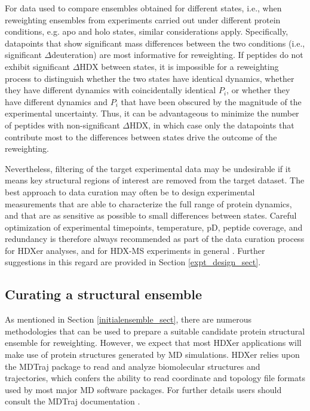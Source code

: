 \documentclass[9pt,tutorial,ASAPversion]{livecoms}
\begin{document}
For data used to compare ensembles obtained for different states, i.e., when reweighting ensembles from experiments carried out under different protein conditions, e.g. apo and holo states, similar considerations apply. Specifically, datapoints that show significant mass differences between the two conditions (i.e., significant $\Delta$deuteration) are most informative for reweighting.
If peptides do not exhibit significant $\Delta$HDX between states, it is impossible for a reweighting process to distinguish whether the two states have identical dynamics, whether they have different dynamics with coincidentally identical $P_i$, or whether they have different dynamics and $P_i$ that have been obscured by the magnitude of the experimental uncertainty.
Thus, it can be advantageous to minimize the number of peptides with non-significant $\Delta$HDX, in which case only the datapoints that contribute most to the differences between states drive the outcome of the reweighting.

Nevertheless, filtering of the target experimental data may be undesirable if it means key structural regions of interest are removed from the target dataset.
The best approach to data curation may often be to design experimental measurements that are able to characterize the full range of protein dynamics, and that are as sensitive as possible to small differences between states.
Careful optimization of experimental timepoints, temperature, pD, peptide coverage, and redundancy is therefore always recommended as part of the data curation process for HDXer analyses, and for HDX-MS experiments in general \cite{Masson2019}.
Further suggestions in this regard are provided in Section \ref{expt_design_sect}.

\subsection{Curating a structural ensemble}
As mentioned in Section \ref{initialensemble_sect}, there are numerous methodologies that can be used to prepare a suitable candidate protein structural ensemble for reweighting.
However, we expect that most HDXer applications will make use of protein structures generated by MD simulations.
HDXer relies upon the MDTraj package to read and analyze biomolecular structures and trajectories, which confers the ability to read coordinate and topology file formats used by most major MD software packages.
For further details users should consult the MDTraj documentation \cite{McGibbon2015MDTraj}.
\end{document}
